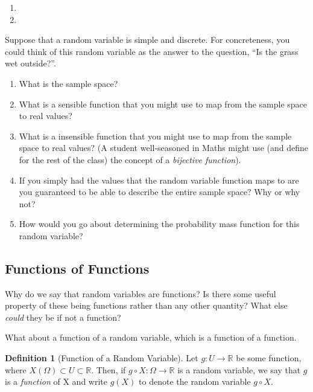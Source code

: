 \documentclass[
]{book}
\providecommand{\tightlist}{%
  \setlength{\itemsep}{0pt}\setlength{\parskip}{0pt}}
\theoremstyle{definition}
\newtheorem{definition}{Definition}[chapter]
\theoremstyle{definition}
\theoremstyle{definition}
\theoremstyle{definition}
\theoremstyle{remark}
\begin{document}
\begin{enumerate}
\def\labelenumi{\arabic{enumi}.}
\tightlist
\item
\item
\end{enumerate}

Suppose that a random variable is simple and discrete. For concreteness, you could think of this random variable as the answer to the question, ``Is the grass wet outside?''.

\begin{enumerate}
\def\labelenumi{\arabic{enumi}.}
\tightlist
\item
  What is the sample space?
\item
  What is a sensible function that you might use to map from the sample space to real values?
\item
  What is a insensible function that you might use to map from the sample space to real values? (A student well-seasoned in Maths might use (and define for the rest of the class) the concept of a \emph{bijective function}).
\item
  If you simply had the values that the random variable function maps to are you guaranteed to be able to describe the entire sample space? Why or why not?
\item
  How would you go about determining the probability mass function for this random variable?
\end{enumerate}

\hypertarget{functions-of-functions}{%
\subsection{Functions of Functions}\label{functions-of-functions}}

Why do we say that random variables are functions? Is there some useful property of these being functions rather than any other quantity? What else \emph{could} they be if not a function?

What about a function of a random variable, which is a function of a function.

\begin{definition}[Function of a Random Variable]
Let \(g : U \rightarrow \mathbb{R}\) be some function, where \(X(\Omega) \subset U \subset \mathbb{R}\). Then, if \(g \circ X : \Omega \rightarrow \mathbb{R}\) is a random variable, we say that \(g\) is a \emph{function} of X and write \(g(X)\) to denote the random variable \(g \circ X\).
\end{definition}
\end{document}
